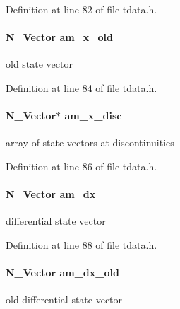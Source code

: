 Definition at line 82 of file tdata.\+h.

\hypertarget{struct_temp_data_ab2b23f4045b47a4a73226543e77f9dcc}{}
\paragraph[{am\+\_\+x\+\_\+old}]{\setlength{\rightskip}{0pt plus 5cm}N\+\_\+\+Vector am\+\_\+x\+\_\+old}\label{struct_temp_data_ab2b23f4045b47a4a73226543e77f9dcc}
old state vector 

Definition at line 84 of file tdata.\+h.

\hypertarget{struct_temp_data_aded6511f60d9b0cdfe5f4df047d8a5dd}{}
\paragraph[{am\+\_\+x\+\_\+disc}]{\setlength{\rightskip}{0pt plus 5cm}N\+\_\+\+Vector$\ast$ am\+\_\+x\+\_\+disc}\label{struct_temp_data_aded6511f60d9b0cdfe5f4df047d8a5dd}
array of state vectors at discontinuities 

Definition at line 86 of file tdata.\+h.

\hypertarget{struct_temp_data_ac10ec733609d33c557d48c1cc4c9f6f1}{}
\paragraph[{am\+\_\+dx}]{\setlength{\rightskip}{0pt plus 5cm}N\+\_\+\+Vector am\+\_\+dx}\label{struct_temp_data_ac10ec733609d33c557d48c1cc4c9f6f1}
differential state vector 

Definition at line 88 of file tdata.\+h.

\hypertarget{struct_temp_data_aca2465f16eeb5dc94cea61c970f2682a}{}
\paragraph[{am\+\_\+dx\+\_\+old}]{\setlength{\rightskip}{0pt plus 5cm}N\+\_\+\+Vector am\+\_\+dx\+\_\+old}\label{struct_temp_data_aca2465f16eeb5dc94cea61c970f2682a}
old differential state vector 

